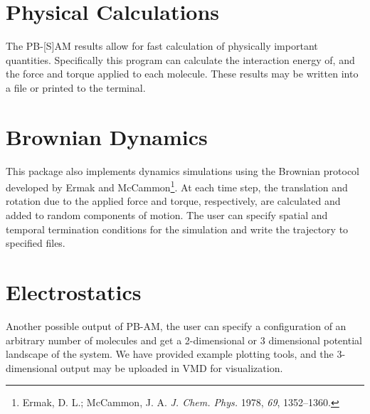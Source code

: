 \section{Physical Calculations} The PB-[S]AM results allow for fast calculation of physically important quantities. 
Specifically this program can calculate the interaction energy of, and the force and torque 
applied to each molecule. These results may be written into a file or printed to the terminal.

\section{Brownian Dynamics} This package also implements dynamics simulations using the 
Brownian protocol developed by Ermak and McCammon\footnote{Ermak, D. L.; McCammon, J. A. \textit{J. Chem. Phys.} 
1978, \textit{69}, 1352\---1360.}. At each time step, the translation and rotation due to the applied 
force and torque, respectively, are calculated and added to random components of motion. The user can specify 
spatial and temporal termination conditions for the simulation and write the trajectory to specified files.

\section{Electrostatics} Another possible output of PB-AM, the user can specify a configuration of an 
arbitrary number of molecules and get a 2-dimensional or 3 dimensional potential landscape of the 
system. We have provided example plotting tools, and the 3-dimensional output may be 
uploaded in VMD for visualization.

\clearpage